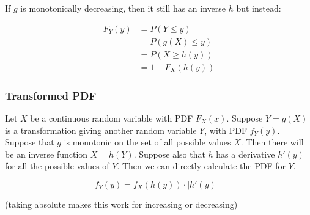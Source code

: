 If $g$ is monotonically decreasing, then it still has an inverse $h$ but instead:

\begin{align*}
      F_Y(y) & = P(Y \leq y)    \\
             & = P(g(X)\leq y)  \\
             & = P(X \geq h(y)) \\
             & = 1 - F_X(h(y))
\end{align*}

\subsubsection*{Transformed PDF}

Let $X$ be a continuous random variable with PDF $F_X(x)$.
Suppose $Y=g(X)$ is a transformation giving another random variable $Y$, with PDF $f_Y(y)$.
Suppose that $g$ is monotonic on the set of all possible values $X$.
Then there will be an inverse function $X=h(Y)$.
Suppose also that $h$ has a derivative $h'(y)$ for all the possible values of $Y$. Then we can directly calculate the PDF for $Y$.

$$ f_Y(y) = f_X(h(y)) \cdot \mid h'(y) \mid $$

(taking absolute makes this work for increasing or decreasing)

